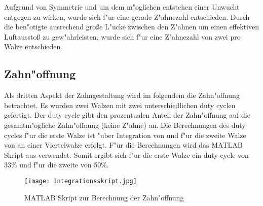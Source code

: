 Aufgrund von Symmetrie und um dem m"oglichen entstehen einer Unwucht entgegen zu wirken, wurde sich f"ur eine gerade Z"ahnezahl entschieden. Durch die ben"otigte ausrechend gro\ss{}e L"ucke zwischen den Z"ahnen um einen effektiven Luftaussto\ss{} zu gew"ahrleisten, wurde sich f"ur eine Z"ahnezahl von zwei pro Walze entschieden.\\

\subsection{Zahn"offnung}
Als dritten Aspekt der Zahngestaltung wird im folgendem die Zahn"offnung betrachtet. Es wurden zwei Walzen mit zwei unterschiedlichen duty cyclen gefertigt. Der duty cycle gibt den prozentualen Anteil der Zahn"offnung auf die gesamtm"ogliche Zahn"offnung (keine Z"ahne) an. Die Berechnungen des duty cycles f"ur die erste Walze ist "uber Integration von  und f"ur die zweite Walze von  an einer Viertelwalze erfolgt. F"ur die Berechnungen wird das MATLAB Skript aus  verwendet. Somit ergibt sich f"ur die erste Walze ein duty cycle von 33\% und f"ur die zweite von 50\%.
\begin{figure}[h]
	\centering
	\texttt{[image: Integrationsskript.jpg]}
	\caption{MATLAB Skript zur Berechnung der Zahn"offnung}
	\label{fig:Integrationsskript}
\end{figure}\\


